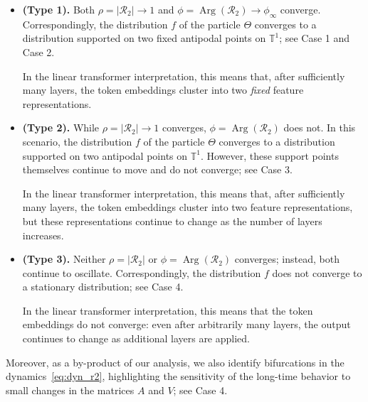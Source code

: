 \documentclass[10pt]{article}
\theoremstyle{definition}
\theoremstyle{definition}
\numberwithin{equation}{section}
\newcommand{\BBT}{\mathbb{T}}
\newcommand{\CR}{\mathcal{R}}
\newcommand{\Arg}{\operatorname{Arg}}
\begin{document}
\begin{itemize}
    \item 
    \textbf{(Type 1).} Both $\rho = |\CR_2| \rightarrow 1$ and $\phi = \Arg(\CR_2) \rightarrow \phi_{\infty}$ converge.
    Correspondingly, the distribution $f$ of the particle $\Theta$ converges to a distribution supported on two fixed antipodal points on $\BBT^1$; see Case 1 and Case 2.

    In the linear transformer interpretation, this means that, after sufficiently many layers, the token embeddings cluster into two \emph{fixed} feature representations.

    \item \textbf{(Type 2).} While
    $\rho = |\CR_2| \rightarrow 1$ converges, $\phi = \Arg(\CR_2)$ does not.
    In this scenario, the distribution $f$ of the particle $\Theta$ converges to a distribution supported on two antipodal points on $\BBT^1$.
    However, these support points themselves continue to move and do not converge; see Case 3.

    In the linear transformer interpretation, this means that, after sufficiently many layers, the token embeddings cluster into two feature representations, but these representations continue to change as the number of layers increases.

    \item \textbf{(Type 3).}
    Neither $\rho = |\CR_2|$ or $\phi = \Arg(\CR_2)$ converges; instead, both continue to oscillate.
    Correspondingly, the distribution $f$ does not converge to a stationary distribution; see Case 4.

    In the linear transformer interpretation, this means that the token embeddings do not converge: even after arbitrarily many layers, the output continues to change as additional layers are applied.
\end{itemize}

Moreover, as a by-product of our analysis, we also identify bifurcations in the dynamics~\eqref{eq:dyn_r2}, highlighting the sensitivity of the long-time behavior to small changes in the matrices $A$ and $V$; see Case 4. 
\end{document}
